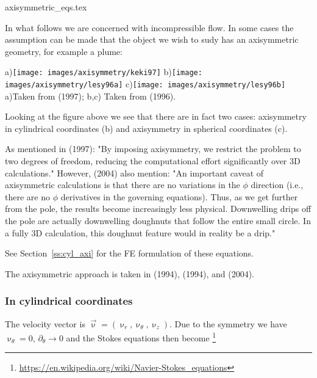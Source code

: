 \begin{flushright} {\tiny {\color{gray} axisymmetric\_eqs.tex}} \end{flushright}

In what follows we are concerned with incompressible flow.
In some cases the assumption can be made that the object we wish to sudy has an 
axisymmetric geometry, for example a plume:

\begin{center}
a)\texttt{[image: images/axisymmetry/keki97]}
b)\texttt{[image: images/axisymmetry/lesy96a]}
c)\texttt{[image: images/axisymmetry/lesy96b]}\\
{\captionfont a)Taken from \textcite{keki97} (1997); 
b,c) Taken from \textcite{lesy96} (1996).}
\end{center}

Looking at the figure above we see that there are in fact two cases: axisymmetry in 
cylindrical coordinates (b) and axisymmetry in spherical coordinates (c).

As mentioned in \textcite{keki97} (1997): "By imposing axisymmetry,
we restrict the problem to two degrees of freedom, reducing the computational
effort significantly over 3D calculations."
However, \cite{reki04} (2004) also mention:
"An important caveat of axisymmetric calculations is that there are no variations 
in the $\phi$ direction (i.e., there are no $\phi$ derivatives in
the governing equations). Thus, as we get further from
the pole, the results become increasingly less physical.
Downwelling drips off the pole are actually downwelling
doughnuts that follow the entire small circle. In a fully
3D calculation, this doughnut feature would in reality be a drip."


See Section~\ref{ss:cyl_axi} for the FE formulation of these equations.

The axisymmetric approach is taken in \textcite{sope94} (1994), \textcite{sope94b} (1994), and 
\textcite{buja04} (2004).


\subsubsection{In cylindrical coordinates}

The velocity vector is $\vec{\upnu}=(\upnu_r,\upnu_\theta,\upnu_z)$. 
Due to the symmetry we have $\upnu_\theta=0$, $\partial_\theta \rightarrow 0$ 
and the Stokes equations 
then become \footnote{\url{https://en.wikipedia.org/wiki/Navier-Stokes_equations}}


